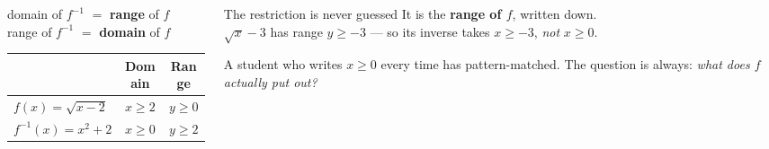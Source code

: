\documentclass[aspectratio=169, 11pt]{beamer}
\begin{document}
\begin{frame}[t, plain]
  \begin{columns}[T]
    \begin{column}{0.50\textwidth}
      \footnotesize
      \begin{center}
      domain of $f^{-1}$ $=$ \textbf{range} of $f$ \\[3pt]
      range of $f^{-1}$ $=$ \textbf{domain} of $f$
      \end{center}
      \vspace{6pt}
      \begin{center}
      \renewcommand{\arraystretch}{1.5}
      \begin{tabular}{|l|c|c|}
      \hline
       & \textbf{Domain} & \textbf{Range} \\ \hline
      $f(x)=\sqrt{x-2}$ & $x\ge2$ & $y\ge0$ \\ \hline
      $f^{-1}(x)=x^{2}+2$ & $x\ge0$ & $y\ge2$ \\ \hline
      \end{tabular}
      \end{center}
    \end{column}
    \begin{column}{0.46\textwidth}
      \footnotesize
      \begin{block}{The restriction is never guessed}
        It is the \textbf{range of $f$}, written down. \\[4pt]
        $\sqrt{x}-3$ has range $y\ge-3$ --- so its inverse takes $x\ge-3$, \emph{not} $x\ge0$.
      \end{block}
      \vspace{4pt}
      A student who writes $x\ge0$ every time has pattern-matched. The question is always:
      \emph{what does $f$ actually put out?}
    \end{column}
  \end{columns}
\end{frame}
\end{document}
